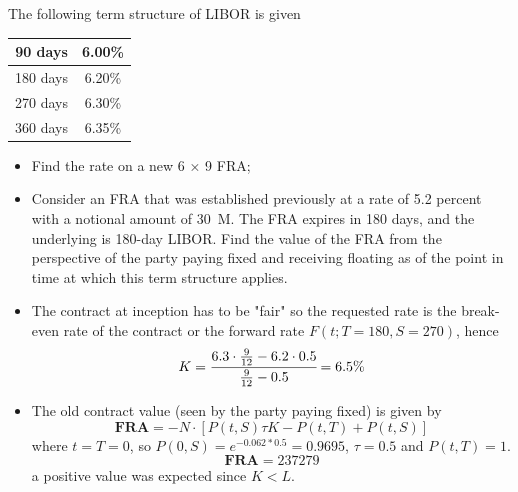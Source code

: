 \documentclass[12pt,a4paper]{book}
\begin{document}
\begin{exercise}[subtitle=Forward Rate Agreement]
The following term structure of LIBOR is given 
\begin{table}[htbp]
\begin{center}
\begin{tabular}{c|c}
90 days & 6.00\% \\ \hline
180 days & 6.20\% \\ \hline
270 days & 6.30\% \\ \hline
360 days & 6.35\% \\
\end{tabular}
\end{center}
\end{table}
\begin{itemize}
\item Find the rate on a new 6 × 9 FRA;
\item Consider an FRA that was established previously at a rate of 5.2 percent with a notional amount of 30~M. The FRA expires in 180 days, and the underlying is 180-day LIBOR. Find the value of the FRA from the perspective of the party paying fixed and receiving floating as of the point in time at which this term structure applies.
\end{itemize}
\end{exercise}
\begin{solution}
\begin{itemize}
\item The contract at inception has to be "fair" so the requested rate is the break-even rate of the contract or the forward rate $F(t; T=180, S=270)$, hence
\begin{equation*}
K = \cfrac{6.3\cdot\frac{9}{12}-6.2\cdot0.5}{\frac{9}{12}-0.5} = 6.5\%
\end{equation*}
\item The old contract value (seen by the party paying fixed) is given by 
\begin{equation*}
\textbf{FRA} = -N\cdot[P(t,S)\tau K - P(t,T) + P(t, S)]
\end{equation*}
where $t=T=0$, so $P(0,S)=e^{-0.062*0.5}= 0.9695$, $\tau=0.5$ and $P(t,T)=1$.
\begin{equation*}
\textbf{FRA} = 237279
\end{equation*}
a positive value was expected since $K<L$.
\end{itemize}
\end{solution}
\end{document}
